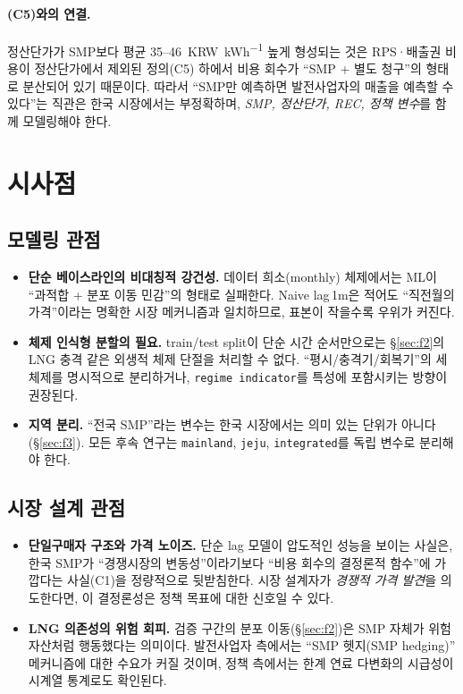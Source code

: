 \documentclass[11pt,a4paper]{article}
\begin{document}
\paragraph{(C5)와의 연결.}
정산단가가 SMP보다 평균 \SI{35}{}--\SI{46}{KRW\per kWh}
높게 형성되는 것은 RPS·배출권 비용이 정산단가에서 제외된 정의(C5)
하에서 비용 회수가 ``SMP + 별도 청구''의 형태로 분산되어 있기
때문이다. 따라서 ``SMP만 예측하면 발전사업자의 매출을
예측할 수 있다''는 직관은 한국 시장에서는 부정확하며,
\emph{SMP, 정산단가, REC, 정책 변수}를 함께 모델링해야 한다.

\section{시사점}
\label{sec:implications}

\subsection{모델링 관점}

\begin{itemize}[leftmargin=1.5em]
  \item \textbf{단순 베이스라인의 비대칭적 강건성.} 데이터 희소(monthly)
        체제에서는 ML이 ``과적합 + 분포 이동 민감''의 형태로 실패한다.
        Naive lag\,1m은 적어도 ``직전월의 가격''이라는 명확한
        시장 메커니즘과 일치하므로, 표본이 작을수록 우위가
        커진다.
  \item \textbf{체제 인식형 분할의 필요.} train/test split이 단순
        시간 순서만으로는 \S\ref{sec:f2}의 LNG 충격 같은 외생적
        체제 단절을 처리할 수 없다. ``평시/충격기/회복기''의
        세 체제를 명시적으로 분리하거나, \texttt{regime indicator}를
        특성에 포함시키는 방향이 권장된다.
  \item \textbf{지역 분리.} ``전국 SMP''라는 변수는 한국 시장에서는
        의미 있는 단위가 아니다(\S\ref{sec:f3}). 모든 후속 연구는
        \texttt{mainland}, \texttt{jeju}, \texttt{integrated}를
        독립 변수로 분리해야 한다.
\end{itemize}

\subsection{시장 설계 관점}

\begin{itemize}[leftmargin=1.5em]
  \item \textbf{단일구매자 구조와 가격 노이즈.} 단순 lag 모델이 압도적인
        성능을 보이는 사실은, 한국 SMP가 ``경쟁시장의 변동성''이라기보다
        ``비용 회수의 결정론적 함수''에 가깝다는 사실(C1)을 정량적으로
        뒷받침한다. 시장 설계자가 \emph{경쟁적 가격 발견}을 의도한다면,
        이 결정론성은 정책 목표에 대한 신호일 수 있다.
  \item \textbf{LNG 의존성의 위험 회피.} 검증 구간의 분포 이동(\S\ref{sec:f2})은
        SMP 자체가 위험 자산처럼 행동했다는 의미이다. 발전사업자
        측에서는 ``SMP 헷지(SMP hedging)'' 메커니즘에 대한 수요가
        커질 것이며, 정책 측에서는 한계 연료 다변화의 시급성이
        시계열 통계로도 확인된다.
\end{itemize}
\end{document}
